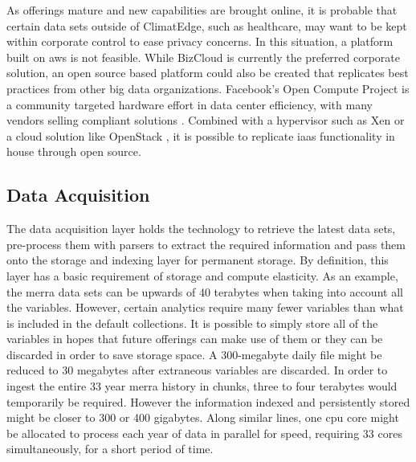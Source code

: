 As offerings mature and new capabilities are brought online, it is probable that certain data sets outside of ClimatEdge, such as healthcare, may want to be kept within corporate control to ease privacy concerns. In this situation, a platform built on \gls{aws} is not feasible. While BizCloud is currently the preferred corporate solution, an open source based platform could also be created that replicates best practices from other big data organizations. Facebook's Open Compute Project is a community targeted hardware effort in data center efficiency, with many vendors selling compliant solutions \cite{opencompute}. Combined with a hypervisor such as Xen \cite{xen} or a cloud solution like OpenStack \cite{openstack}, it is possible to replicate \gls{iaas} functionality in house through open source.
\subsection{Data Acquisition}
The data acquisition layer holds the technology to retrieve the latest data sets, pre-process them with parsers  to extract the required information and pass them onto the storage and indexing layer for permanent storage. By definition, this layer has a basic requirement of storage and compute elasticity. As an example, the \gls{merra} data sets can be upwards of 40 terabytes when taking into account all the variables. However, certain analytics require many fewer variables than what is included in the default collections. It is possible to simply store all of the variables in hopes that future offerings can make use of them or they can be discarded in order to save storage space. A 300-megabyte daily file might be reduced to 30 megabytes after extraneous variables are discarded. In order to ingest the entire 33 year \gls{merra} history in chunks, three to four terabytes would  temporarily be required. However the information indexed and persistently stored might be closer to 300 or 400 gigabytes. Along similar lines, one \gls{cpu} core might be allocated to process each year of data in parallel for speed, requiring 33 cores simultaneously, for a short period of time.\\

